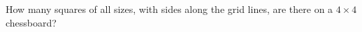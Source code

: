 How many squares of all sizes, with sides along the grid lines, are there on a $4\times4$ chessboard?
